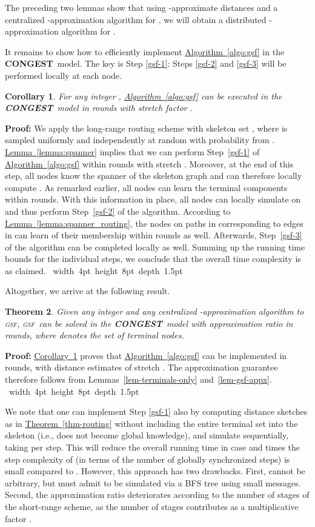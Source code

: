 \documentclass[letterpaper,11pt]{article}
\newcommand{\namedref}[2]{\hyperref[#2]{#1~\ref*{#2}}}
\newcommand{\theoremref}[1]{\namedref{Theorem}{#1}}
\newcommand{\lemmaref}[1]{\namedref{Lemma}{#1}}
\newcommand{\corollaryref}[1]{\namedref{Corollary}{#1}}
\newcommand{\algref}[1]{\namedref{Algorithm}{#1}}
\newtheorem{theorem}{Theorem}[section]
\newtheorem{corollary}[theorem]{Corollary}
\newcommand{\blackslug}{\hbox{\hskip 1pt \vrule width 4pt height 8pt
depth 1.5pt \hskip 1pt}}
\newcommand{\QED}{\quad\blackslug\lower 8.5pt\null\par}
\newenvironment{proof}[1][Proof:]{\noindent \textbf{#1}\xspace}{\QED}
\newcommand{\CONGEST}{\textbf{CONGEST}}
\newcommand{\gsf}{\textsc{gsf}}
\begin{document}
The preceding two lemmas show that using -approximate distances and a
centralized -approxima\-tion algorithm for , we will obtain a
distributed -approximation algorithm for .

It remains to show how to efficiently implement \algref{algo:gsf} in the
\CONGEST\ model. The key is Step \ref{gsf-1}: Steps \ref{gsf-2} and
\ref{gsf-3} will be performed locally at each node.
\begin{corollary}\label{coro:gsf_impl}
For any integer , \algref{algo:gsf} can be
executed in the \CONGEST\ model in
 rounds with stretch factor 
.
\end{corollary}
\begin{proof}
We apply the long-range routing scheme with skeleton set , where
 is sampled uniformly and independently at random with probability
 from . \lemmaref{lemma:spanner} implies that we can perform
Step~\ref{gsf-1} of \algref{algo:gsf} within
 rounds with stretch .
Moreover, at the end of this step, all nodes know the spanner of the skeleton
graph and can therefore locally compute . As remarked earlier, all nodes can
learn the terminal components within  rounds. With this information in place,
all nodes can locally simulate  on  and thus perform Step~\ref{gsf-2}
of the algorithm. According to \lemmaref{lemma:spanner_routing}, the nodes on
paths in  corresponding to edges in  can learn of their membership within
 rounds as well. Afterwards,
Step~\ref{gsf-3} of the algorithm can be completed locally as well. Summing up
the running time bounds for the individual steps, we conclude that the overall
time complexity is  as claimed.
\end{proof}

Altogether, we arrive at the following result.
\begin{theorem}
Given any integer  and any centralized -approximation
algorithm to \gsf, \gsf\ can be solved in the \CONGEST\ model with approximation
ratio  in  rounds, where 
denotes the set of terminal nodes.
\end{theorem}
\begin{proof}
\corollaryref{coro:gsf_impl} proves that \algref{algo:gsf} can be implemented in
 rounds, with distance estimates of
stretch .
The approximation guarantee therefore follows from
Lemmas~\ref{lem-terminals-only} 
and~\ref{lem-gsf-appx}.
\end{proof}

We note that one can implement Step \ref{gsf-1} also by computing distance
sketches as in \theoremref{thm-routing} without including the entire terminal
set into the skeleton (i.e.,  does not become global knowledge), and
simulate  sequentially, taking  per step. This will reduce the
overall running time in case  and  times the step
complexity of  (in terms of the number of globally synchronized steps) is
small compared to . However, this approach has two drawbacks. 
First,  cannot be arbitrary, but must admit to be simulated via a BFS tree
using small messages. Second, the approximation ratio deteriorates according to
the number of stages of the short-range scheme, as the number of stages
contributes as a multiplicative factor .
\end{document}
